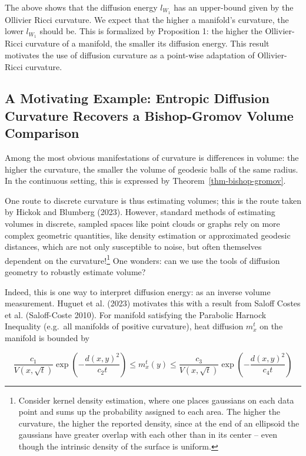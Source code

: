 \documentclass[
  letterpaper,
  DIV=11,
  numbers=noendperiod]{scrartcl}
\theoremstyle{plain}
\theoremstyle{plain}
\theoremstyle{definition}
\theoremstyle{plain}
\theoremstyle{definition}
\theoremstyle{plain}
\theoremstyle{remark}
\begin{document}
The above shows that the diffusion energy \(l_{W_1}\) has an upper-bound
given by the Ollivier Ricci curvature. We expect that the higher a
manifold's curvature, the lower \(l_{W_{1}}\) should be. This is
formalized by Proposition 1: the higher the Ollivier-Ricci curvature of
a manifold, the smaller its diffusion energy. This result motivates the
use of diffusion curvature as a point-wise adaptation of Ollivier-Ricci
curvature.

\subsection{A Motivating Example: Entropic Diffusion Curvature Recovers
a Bishop-Gromov Volume
Comparison}\label{a-motivating-example-entropic-diffusion-curvature-recovers-a-bishop-gromov-volume-comparison}

Among the most obvious manifestations of curvature is differences in
volume: the higher the curvature, the smaller the volume of geodesic
balls of the same radius. In the continuous setting, this is expressed
by Theorem~\ref{thm-bishop-gromov}.

One route to discrete curvature is thus estimating volumes; this is the
route taken by Hickok and Blumberg (2023). However, standard methods of
estimating volumes in discrete, sampled spaces like point clouds or
graphs rely on more complex geometric quantities, like density
estimation or approximated geodesic distances, which are not only
susceptible to noise, but often themselves dependent on the
curvature!\footnote{Consider kernel density estimation, where one places
  gaussians on each data point and sums up the probability assigned to
  each area. The higher the curvature, the higher the reported density,
  since at the end of an ellipsoid the gaussians have greater overlap
  with each other than in its center -- even though the intrinsic
  density of the surface is uniform.} One wonders: can we use the tools
of diffusion geometry to robustly estimate volume?

Indeed, this is one way to interpret diffusion energy: as an inverse
volume measurement. Huguet et al. (2023) motivates this with a result
from Saloff Costes et al. (Saloff-Coste 2010). For manifold satisfying
the Parabolic Harnock Inequality (e.g.~all manifolds of positive
curvature), heat diffusion \(m_{x}^t\) on the manifold is bounded by

\[
\frac{c_1}{V(x, \sqrt{t})} \exp \left(-\frac{d(x, y)^2}{c_2 t}\right) \leq m_{x}^t(y) \leq \frac{c_3}{V(x, \sqrt{t})} \exp \left(-\frac{d(x, y)^2}{c_4 t}\right)
\]
\end{document}
